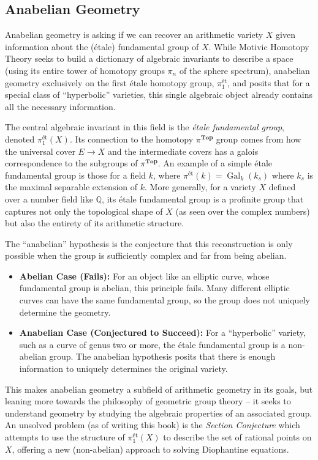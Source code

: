 \documentclass{article}
\newcommand{\Top}{{\textbf{Top}}}
\newcommand{\Gal}{{\operatorname{Gal}}}
\begin{document}
\subsection*{Anabelian Geometry}

Anabelian geometry is asking if we can recover an arithmetic variety $X$ given information about the (\'etale)
fundamental group of $X$. While  Motivic Homotopy Theory seeks to build a dictionary of algebraic invariants
to describe a space (using its entire tower of homotopy groups \( \pi_n \) of the sphere spectrum), anabelian
geometry exclusively on the first \'etale homotopy group, \( \pi_1^{\text{\'et}} \), and posits that for a
special class of ``hyperbolic'' varieties, this single algebraic object already contains all the necessary
information.


The central algebraic invariant in this field is the \emph{\'etale fundamental group},
denoted \( \pi_1^{\text{\'et}}(X) \). Its connection to the homotopy $\pi^\Top$ group comes from how the universal cover $E
\to X$ and the intermediate covers has a galois correspondence to the subgroups of $\pi^{\Top}$. An example of
a simple \'etale fundamental group is those for a field $k$, where $\pi^{\text{\'et}}(k) =\Gal_k(k_s)$ where
$k_s$ is the maximal separable extension of $k$.
More generally, for a variety \(X\) defined over a number field like \(
\mathbb{Q} \), its \'etale fundamental group is a profinite group that captures not only the
topological shape of \(X\) (as seen over the complex numbers) but also the entirety of its arithmetic
structure.

The ``anabelian'' hypothesis is the conjecture that this reconstruction is only possible when the group is sufficiently complex and far from being abelian.
\begin{itemize}
    \item \textbf{Abelian Case (Fails):} For an object like an elliptic curve, whose fundamental group is abelian, this principle fails. Many different elliptic curves can have the same fundamental group, so the group does not uniquely determine the geometry.
    \item \textbf{Anabelian Case (Conjectured to Succeed):} For a ``hyperbolic'' variety, such as a curve of
		genus two or more, the \'etale fundamental group is a non-abelian group. The anabelian hypothesis
		posits that there is enough information to uniquely determines the original variety.
\end{itemize}

This makes anabelian geometry a subfield of arithmetic geometry in its goals, but leaning more towards the
philosophy of geometric group theory -- it seeks to understand geometry by studying the algebraic properties
of an associated group. An unsolved problem (as of writing this book) is the \emph{Section Conjecture} which
attempts to use the structure of \( \pi_1^{\text{ét}}(X) \) to describe the set of rational points on \(X\),
offering a new (non-abelian) approach to solving Diophantine equations.



\printbibliography
\end{document}
